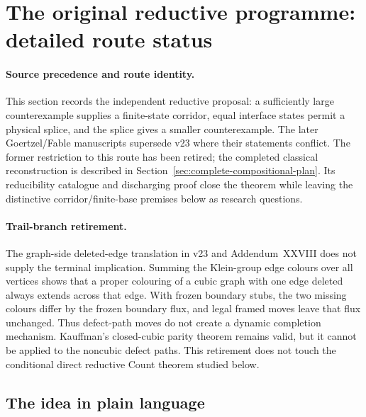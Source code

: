 \documentclass[11pt]{article}
\theoremstyle{definition}
\begin{document}
\appendix









\section{The original reductive programme: detailed route status}
\label{sec:current}

\paragraph{Source precedence and route identity.}
This section records the independent reductive proposal: a sufficiently
large counterexample supplies a finite-state corridor, equal interface states
permit a physical splice, and the splice gives a smaller counterexample.
The later Goertzel/Fable manuscripts supersede v23 where their statements
conflict. The former restriction to this route has been retired; the
completed classical reconstruction is described in
Section~\ref{sec:complete-compositional-plan}. Its reducibility catalogue and
discharging proof close the theorem while leaving the distinctive
corridor/finite-base premises below as research questions.

\paragraph{Trail-branch retirement.}
The graph-side deleted-edge translation in v23 and Addendum~XXVIII does not
supply the terminal implication.  Summing the Klein-group edge colours over
all vertices shows that a proper colouring of a cubic graph with one edge
deleted always extends across that edge.  With frozen boundary stubs, the two
missing colours differ by the frozen boundary flux, and legal framed moves
leave that flux unchanged.  Thus defect-path moves do not create a dynamic
completion mechanism.  Kauffman's closed-cubic parity theorem remains valid,
but it cannot be applied to the noncubic defect paths.  This retirement does
not touch the conditional direct reductive Count theorem studied below.

\subsection{The idea in plain language}
\end{document}
